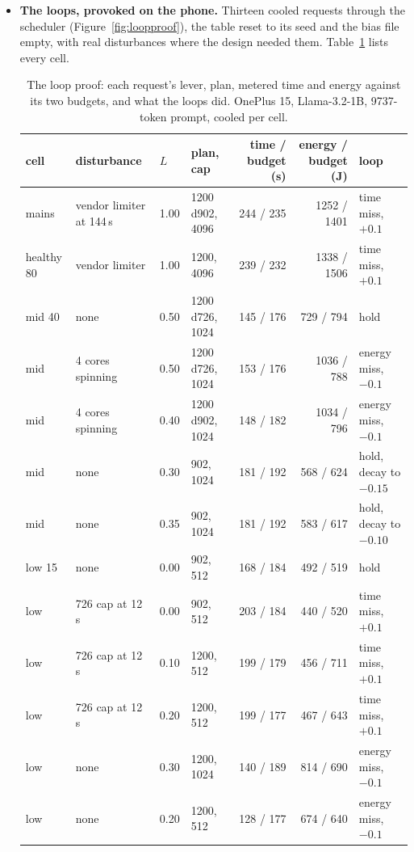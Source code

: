 \documentclass[11pt]{article}
\begin{document}
\begin{itemize}
\item \textbf{The loops, provoked on the phone.} Thirteen cooled requests through the scheduler
(Figure~\ref{fig:loopproof}), the table reset to its seed and the bias file empty, with real
disturbances where the design needed them. Table~\ref{tab:loopproof} lists every cell.

\begin{table}[h]
\centering\small
\caption{The loop proof: each request's lever, plan, metered time and energy against its two
budgets, and what the loops did. OnePlus 15, Llama-3.2-1B, 9737-token prompt, cooled per cell.}
\label{tab:loopproof}
\begin{tabular}{@{}llllrrl@{}}
\toprule
\textbf{cell} & \textbf{disturbance} & \textbf{$L$} & \textbf{plan, cap} & \textbf{time / budget (s)} & \textbf{energy / budget (J)} & \textbf{loop} \\
\midrule
mains       & vendor limiter at 144\,s & 1.00 & 1200 d902, 4096 & 244 / 235 & 1252 / 1401 & time miss, $+0.1$ \\
healthy 80  & vendor limiter           & 1.00 & 1200, 4096      & 239 / 232 & 1338 / 1506 & time miss, $+0.1$ \\
mid 40      & none                     & 0.50 & 1200 d726, 1024 & 145 / 176 &  729 / 794  & hold \\
mid         & 4 cores spinning         & 0.50 & 1200 d726, 1024 & 153 / 176 & 1036 / 788  & energy miss, $-0.1$ \\
mid         & 4 cores spinning         & 0.40 & 1200 d902, 1024 & 148 / 182 & 1034 / 796  & energy miss, $-0.1$ \\
mid         & none                     & 0.30 & 902, 1024       & 181 / 192 &  568 / 624  & hold, decay to $-0.15$ \\
mid         & none                     & 0.35 & 902, 1024       & 181 / 192 &  583 / 617  & hold, decay to $-0.10$ \\
low 15      & none                     & 0.00 & 902, 512        & 168 / 184 &  492 / 519  & hold \\
low         & 726 cap at 12\,s         & 0.00 & 902, 512        & 203 / 184 &  440 / 520  & time miss, $+0.1$ \\
low         & 726 cap at 12\,s         & 0.10 & 1200, 512       & 199 / 179 &  456 / 711  & time miss, $+0.1$ \\
low         & 726 cap at 12\,s         & 0.20 & 1200, 512       & 199 / 177 &  467 / 643  & time miss, $+0.1$ \\
low         & none                     & 0.30 & 1200, 1024      & 140 / 189 &  814 / 690  & energy miss, $-0.1$ \\
low         & none                     & 0.20 & 1200, 512       & 128 / 177 &  674 / 640  & energy miss, $-0.1$ \\
\bottomrule
\end{tabular}
\end{table}


\end{itemize}
\end{document}
